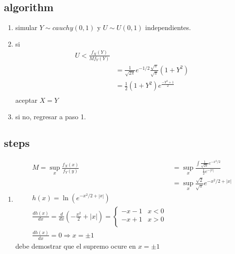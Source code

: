 \documentclass[10pt, oneside]{article}
\begin{document}
\subsection{algorithm}

\begin{enumerate}
	\item simular $Y \sim cauchy(0,1)$ y $U \sim U(0,1)$ independientes.
	\item si
	      \[
		      \begin{split}
			      U < \frac{f_X(Y)}{M f_Y(Y)}                                                 \\
			       & = \frac{1}{\sqrt{2\pi}} e^{-1/2} \frac{\sqrt{\pi}}{\sqrt{\pi}} (1 + Y^2) \\
			       & = \frac{1}{2}(1 + Y^2) e^{\frac{-Y^2 +1}{2}}                             \\
		      \end{split}
	      \]
	      aceptar $X = Y$
	\item si no, regresar a paso 1.
\end{enumerate}

\subsection{steps}
\begin{enumerate}
	\item
	      \[
		      \begin{split}
			      M = \sup_x \frac{f_X(x)}{f_Y(y)} & = \sup_x \frac{\int \frac{1}{\sqrt{2\pi}} e^{-x^2/2}}{\frac{1}{2} e^{-|x|}} \\
			                                       & = \sup_x \frac{\sqrt{2}}{\sqrt{\pi}} e^{-x^2/2 + |x|}                       \\
			      h(x) = \ln \left( e^{-x^2/2 + |x|} \right)                                                                     \\
			      \frac{d h(x)}{dx} = \frac{d}{dx} \left( -\frac{x^2}{2} + |x| \right) = \begin{cases}
				                                                                             -x - 1 & x < 0 \\
				                                                                             -x + 1 & x > 0 \\
			                                                                             \end{cases}                          \\
			      \frac{d h(x)}{dx} = 0 \Rightarrow x = \pm 1
		      \end{split}
	      \]
	      debe demostrar que el supremo ocure en $x = \pm 1$
\end{enumerate}
\end{document}
